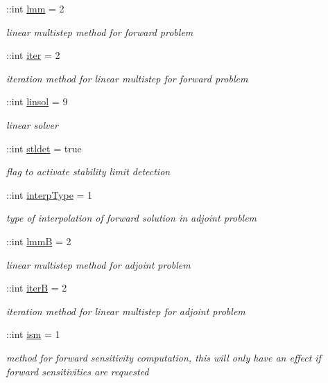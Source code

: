 \begin{DoxyCompactItemize}
\+::int \hyperlink{classamioption_a6f4b21b13e0c8c531c452c70b43fc96a}{lmm} = 2
\begin{DoxyCompactList}\small\item\em linear multistep method for forward problem \end{DoxyCompactList}\item 
\+::int \hyperlink{classamioption_a1fc3ae6bd5c6a80e9b81b27fc7b7a11a}{iter} = 2
\begin{DoxyCompactList}\small\item\em iteration method for linear multistep for forward problem \end{DoxyCompactList}\item 
\+::int \hyperlink{classamioption_a06749b49eaa313f4d00f0115d3a7a7f3}{linsol} = 9
\begin{DoxyCompactList}\small\item\em linear solver \end{DoxyCompactList}\item 
\+::int \hyperlink{classamioption_a202e02f7d8c1a87b1c675bcc1acf1c8e}{stldet} = true
\begin{DoxyCompactList}\small\item\em flag to activate stability limit detection \end{DoxyCompactList}\item 
\+::int \hyperlink{classamioption_ad06cc805fa18b06ac937fd98a9eba0e7}{interp\+Type} = 1
\begin{DoxyCompactList}\small\item\em type of interpolation of forward solution in adjoint problem \end{DoxyCompactList}\item 
\+::int \hyperlink{classamioption_afbc60e75d11740bf27f5a7fc5706fd44}{lmm\+B} = 2
\begin{DoxyCompactList}\small\item\em linear multistep method for adjoint problem \end{DoxyCompactList}\item 
\+::int \hyperlink{classamioption_ae6a49cec21ffe790217be29b0fced832}{iter\+B} = 2
\begin{DoxyCompactList}\small\item\em iteration method for linear multistep for adjoint problem \end{DoxyCompactList}\item 
\+::int \hyperlink{classamioption_aada9d6834569ad5c542cb8dc6b26ea46}{ism} = 1
\begin{DoxyCompactList}\small\item\em method for forward sensitivity computation, this will only have an effect if forward sensitivities are requested \end{DoxyCompactList}\item 

\end{DoxyCompactItemize}
